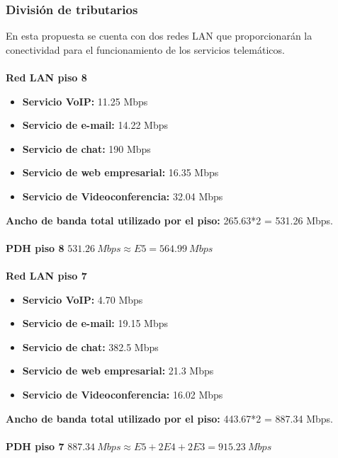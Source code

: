 \documentclass[12pt,letterpaper]{article}
\begin{document}
\subsubsection{División de tributarios}
En esta propuesta se cuenta con dos redes LAN que proporcionarán la conectividad para 
el funcionamiento de los servicios telemáticos.
\\ \\
\textbf{Red LAN piso 8}
\begin{itemize}
    \item \textbf{Servicio VoIP:} 11.25 Mbps
    \item \textbf{Servicio de e-mail: }14.22 Mbps
    \item \textbf{Servicio de chat: } 190 Mbps
    \item \textbf{Servicio de web empresarial: } 16.35 Mbps
    \item \textbf{Servicio de Videoconferencia: } 32.04 Mbps
\end{itemize}
\textbf{Ancho de banda total utilizado por el piso: }265.63*2 = 531.26 Mbps.
\\ \\
\textbf{PDH piso 8}
\newline
$531.26 \ Mbps \approx E5 = 564.99 \ Mbps$
\\ \\
\textbf{Red LAN piso 7}
\begin{itemize}
    \item \textbf{Servicio VoIP:} 4.70 Mbps
    \item \textbf{Servicio de e-mail: } 19.15 Mbps
    \item \textbf{Servicio de chat: } 382.5 Mbps
    \item \textbf{Servicio de web empresarial: } 21.3 Mbps
    \item \textbf{Servicio de Videoconferencia: } 16.02 Mbps
\end{itemize}
\textbf{Ancho de banda total utilizado por el piso: }443.67*2 = 887.34 Mbps.
\\ \\
\textbf{PDH piso 7}
\newline
$887.34 \ Mbps \approx E5 + 2E4+2E3 = 915.23 \ Mbps$

\newpage
\end{document}
